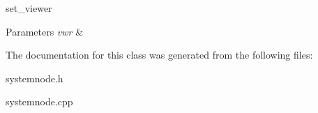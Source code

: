 set\+\_\+viewer 


\begin{DoxyParams}{Parameters}
{\em vwr} & \\
\hline
\end{DoxyParams}


The documentation for this class was generated from the following files\+:\begin{DoxyCompactItemize}
\item 
systemnode.\+h\item 
systemnode.\+cpp\end{DoxyCompactItemize}
